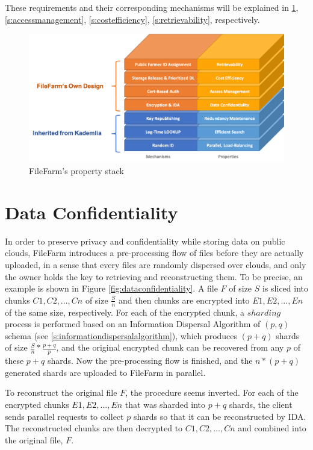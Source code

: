 \noindent These requirements and their corresponding mechanisms will be explained in \ref{s:dataconfidentiality}, \ref{s:accessmanagement}, \ref{s:costefficiency}, \ref{s:retrievability}, respectively.

\begin{figure}[hbt]
\centering
  \includegraphics[width=14cm]{figures/property_stack.png}
  \caption{FileFarm's property stack}
  \label{fig:propertystack}
\end{figure}

\section{Data Confidentiality}
\label{s:dataconfidentiality}

In order to preserve privacy and confidentiality while storing data on public clouds, FileFarm introduces a pre-processing flow of files before they are actually uploaded, in a sense that every files are randomly dispersed over clouds, and only the owner holds the key to retrieving and reconstructing them. To be precise, an example is shown in Figure \ref{fig:dataconfidentiality}. A file $F$ of size $S$ is sliced into chunks $C1, C2, ..., Cn$ of size $\frac{S}{n}$ and then chunks are encrypted into $E1, E2, ..., En$ of the same size, respectively. For each of the encrypted chunk, a $sharding$ process is performed based on an Information Dispersal Algorithm of $(p,q)$ schema (see \ref{s:informationdispersalalgorithm}), which produces $(p+q)$ shards of size $\frac{S}{n}*\frac{p+q}{p}$, and the original encrypted chunk can be recovered from any $p$ of these $p+q$ shards. Now the pre-processing flow is finished, and the $n*(p+q)$ generated shards are uploaded to FileFarm in parallel.

To reconstruct the original file $F$, the procedure seems inverted. For each of the encrypted chunks $E1, E2, ..., En$ that was sharded into $p+q$ shards, the client sends parallel requests to collect $p$ shards so that it can be reconstructed by IDA. The reconstructed chunks are then decrypted to $C1, C2, ..., Cn$ and combined into the original file, $F$.

